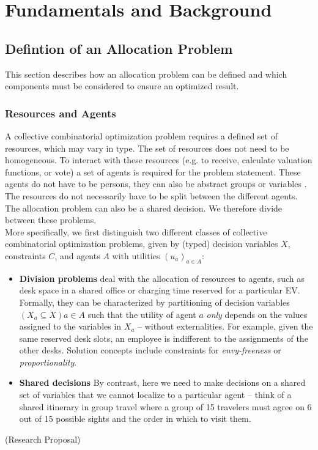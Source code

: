 \documentclass[german, a4paper, 11pt, oneside]{scrbook}
\begin{document}
\chapter{Fundamentals and Background}
\section{Defintion of an Allocation Problem}
This section describes how an allocation problem can be defined and which components must be considered to ensure an optimized result.
\subsection{Resources and Agents}
A collective combinatorial optimization problem requires a defined set of resources, which may vary in type.  The set of resources does not need to be homogeneous. To interact with these resources (e.g. to receive, calculate valuation functions, or vote) a set of agents is required for the problem statement. These agents do not have to be persons, they can also be abstract groups or variables \cite{.2022, FelixBrandtVincentConitzerUlleEndrissJeromeLangandArielD.Procaccia.}. The resources do not necessarily have to be split between the different agents. The allocation problem can also be a shared decision. We therefore divide between these problems. \\More specifically, we first distinguish two different classes of collective combinatorial optimization problems, given by (typed) decision variables $X$, constraints $C$, and agents $A$ with utilities $(u_a)_{a \in A}$:

\begin{itemize}
    \item \textbf{Division problems} deal with the allocation of resources to agents, such as desk space in a shared office or charging time reserved for a particular EV. Formally, they can be characterized by partitioning of decision variables $(X_a \subseteq X) {a \in A}$ such that the utility of agent $a$ \emph{only} depends on the values assigned to the variables in $X_a$ -- without externalities. For example, given the same reserved desk slots, an employee is indifferent to the assignments of the other desks. Solution concepts include constraints for \emph{envy-freeness} or \emph{proportionality}.
    \item \textbf{Shared decisions} By contrast, here we need to make decisions on a shared set of variables that we cannot localize to a particular agent -- think of a shared itinerary in group travel where a group of 15 travelers must agree on 6 out of 15 possible sights and the order in which to visit them. 
\end{itemize}
(Research Proposal)
\end{document}
